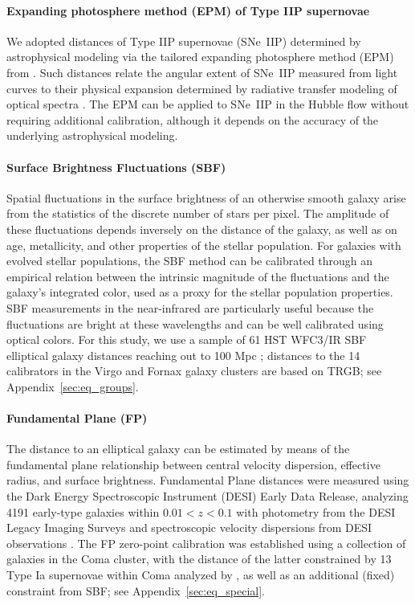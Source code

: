 \paragraph{Expanding photosphere method (EPM) of Type IIP supernovae}
We adopted distances of Type IIP supernovae (SNe~IIP) determined by astrophysical modeling via the tailored expanding photosphere method (EPM) from \citet{2025AA...702A..41V}. Such distances relate the angular extent of SNe~IIP measured from light curves to their physical expansion determined by radiative transfer modeling of optical spectra \citep{2020A&A...633A..88V,2023AA...672A.129C}. The EPM can be applied to SNe~IIP in the Hubble flow without requiring additional calibration, although it depends on the accuracy of the underlying astrophysical modeling.


\paragraph{\textbf{Surface Brightness Fluctuations (SBF)}} Spatial fluctuations in the surface brightness of an otherwise smooth galaxy arise from the statistics of the discrete number of stars per pixel. The amplitude of these fluctuations depends inversely on the distance of the galaxy, as well as on age, metallicity, and other properties of the stellar population.
For galaxies with evolved stellar populations, the SBF method can be calibrated through an empirical relation between the intrinsic magnitude of the fluctuations and the galaxy's integrated color, used as a proxy for the stellar population properties. SBF measurements in the near-infrared are particularly useful because the fluctuations are bright at these wavelengths and can be well calibrated using optical colors.
For this study, we use a sample of 61 HST WFC3/IR SBF elliptical galaxy distances reaching out to 100 Mpc \citep{2025ApJ...987...87J,2021ApJS..255...21J,2021ApJ...911...65B}; distances to the 14 calibrators in the Virgo and Fornax galaxy clusters are based on TRGB; see Appendix~\ref{sec:eq_groups}.

\paragraph{Fundamental Plane (FP)}
The distance to an elliptical galaxy can be estimated by means of the fundamental plane relationship between central velocity dispersion, effective radius, and surface brightness.
Fundamental Plane distances were measured using the Dark Energy Spectroscopic Instrument (DESI) Early Data Release, analyzing 4191 early-type galaxies within $0.01 < z < 0.1$ with photometry from the DESI Legacy Imaging Surveys and spectroscopic velocity dispersions from DESI observations \citep{2025MNRAS.539.3627S}. The FP zero-point calibration was established using a collection of galaxies in the Coma cluster, with the distance of the latter constrained by 13 Type Ia supernovae within Coma analyzed by \citet{2025ApJ...979L...9S}, as well as an additional (fixed) constraint from SBF; see Appendix~\ref{sec:eq_special}.

